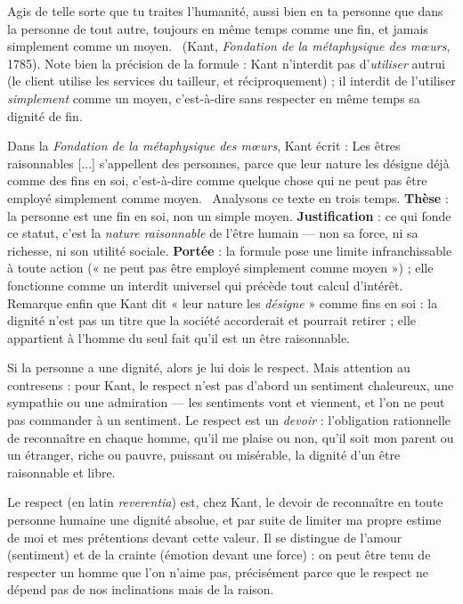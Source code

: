 \documentclass[11pt]{article}
\newcommand{\cle}[1]{{\popxbold\color{popdark}#1}}
\newcounter{popsec}
\newcounter{popsub}
\newcommand{\courssub}[1]{%
  \stepcounter{popsub}%
  \par\vspace{9pt}\noindent{\popxbold\fontsize{11.5}{13}\selectfont\color{popink}{\color{poporange}\thepopsec.\thepopsub}\hspace{6pt}#1}\par\nopagebreak\vspace{4pt}
}
\begin{document}
\begin{aretenir}
\guillemotleft Agis de telle sorte que tu traites l'humanité, aussi bien en ta personne que dans la personne de tout autre, toujours en même temps comme une fin, et jamais simplement comme un moyen. \guillemotright\ (Kant, \emph{Fondation de la métaphysique des mœurs}, 1785). Note bien la précision de la formule : Kant n'interdit pas d'\emph{utiliser} autrui (le client utilise les services du tailleur, et réciproquement) ; il interdit de l'utiliser \emph{simplement} comme un moyen, c'est-à-dire sans respecter en même temps sa dignité de fin.
\end{aretenir}

\begin{experience}
Dans la \emph{Fondation de la métaphysique des mœurs}, Kant écrit : \guillemotleft Les êtres raisonnables [...] s'appellent des personnes, parce que leur nature les désigne déjà comme des fins en soi, c'est-à-dire comme quelque chose qui ne peut pas être employé simplement comme moyen. \guillemotright\ Analysons ce texte en trois temps. \textbf{Thèse} : la personne est une fin en soi, non un simple moyen. \textbf{Justification} : ce qui fonde ce statut, c'est la \emph{nature raisonnable} de l'être humain — non sa force, ni sa richesse, ni son utilité sociale. \textbf{Portée} : la formule pose une limite infranchissable à toute action (« ne peut pas être employé simplement comme moyen ») ; elle fonctionne comme un interdit universel qui précède tout calcul d'intérêt. Remarque enfin que Kant dit « leur nature les \emph{désigne} » comme fins en soi : la dignité n'est pas un titre que la société accorderait et pourrait retirer ; elle appartient à l'homme du seul fait qu'il est un être raisonnable.
\end{experience}

\courssub{Le respect : un devoir, non un sentiment}

Si la personne a une dignité, alors je lui dois le \cle{respect}. Mais attention au contresens : pour Kant, le respect n'est pas d'abord un sentiment chaleureux, une sympathie ou une admiration — les sentiments vont et viennent, et l'on ne peut pas commander à un sentiment. Le respect est un \emph{devoir} : l'obligation rationnelle de reconnaître en chaque homme, qu'il me plaise ou non, qu'il soit mon parent ou un étranger, riche ou pauvre, puissant ou misérable, la dignité d'un être raisonnable et libre.

\begin{definition}[Le respect]
Le \cle{respect} (en latin \emph{reverentia}) est, chez Kant, le devoir de reconnaître en toute personne humaine une dignité absolue, et par suite de limiter ma propre estime de moi et mes prétentions devant cette valeur. Il se distingue de l'amour (sentiment) et de la crainte (émotion devant une force) : on peut être tenu de respecter un homme que l'on n'aime pas, précisément parce que le respect ne dépend pas de nos inclinations mais de la raison.
\end{definition}
\end{document}
